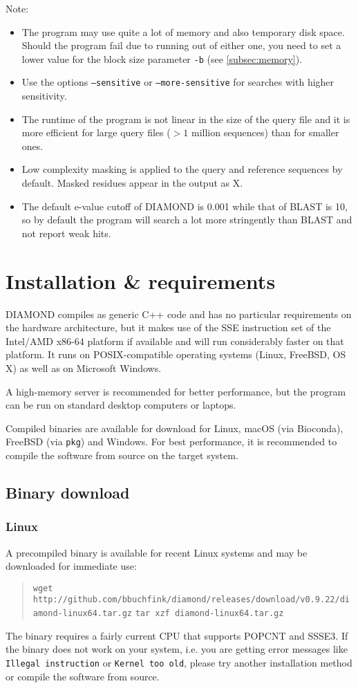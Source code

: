 \documentclass[11pt]{article}
\newcommand{\CURRENT}{0.9.22}
\begin{document}
Note:
\begin{itemize}
\item
The program may use quite a lot of memory and also temporary disk space. Should the program fail due to running out of either one, you need to set a lower value for the block size parameter \texttt{-b} (see \ref{subsec:memory}).
\item
Use the options \texttt{--sensitive} or \texttt{--more-sensitive} for searches with higher sensitivity.
\item
The runtime of the program is not linear in the size of the query file and it is more efficient for large query files ($> 1$ million sequences) than for smaller ones.
\item
Low complexity masking is applied to the query and reference sequences by default. Masked residues appear in the output as X.
\item
The default e-value cutoff of DIAMOND is 0.001 while that of BLAST is 10, so by default the program will search a lot more stringently than BLAST and not report weak hits.
\end{itemize}

\section{Installation \& requirements}
DIAMOND compiles as generic C++ code and has no particular requirements on the hardware architecture, but it makes use of the SSE instruction set of the Intel/AMD x86-64 platform if available and will run considerably faster on that platform. It runs on POSIX-compatible operating systems (Linux, FreeBSD, OS X) as well as on Microsoft Windows.

A high-memory server is recommended for better performance, but the program can be run on standard desktop computers or laptops.

Compiled binaries are available for download for Linux, macOS (via Bioconda), FreeBSD (via \texttt{pkg}) and Windows. For best performance, it is recommended to compile the software from source on the target system.
\subsection{Binary download}
\subsubsection{Linux}
A precompiled binary is available for recent Linux systems and may be downloaded for immediate use:
\begin{quote}
\begin{footnotesize}
\texttt{wget http://github.com/bbuchfink/diamond/releases/download/v\CURRENT/diamond-linux64.tar.gz}
\texttt{tar xzf diamond-linux64.tar.gz}
\end{footnotesize}
\end{quote}
The binary requires a fairly current CPU that supports POPCNT and SSSE3. If the binary does not work on your system, i.e. you are getting error messages like \texttt{Illegal instruction} or \texttt{Kernel too old}, please try another installation method or compile the software from source.
\end{document}
